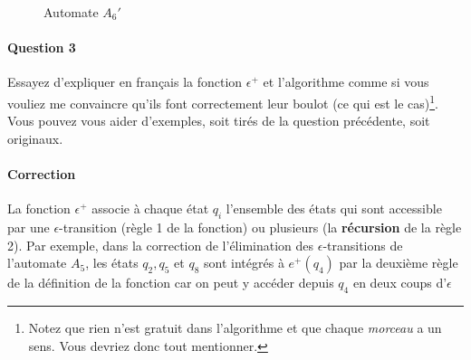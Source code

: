 \documentclass{article}[11pt]
\theoremstyle{definition}
\begin{document}
\begin{figure}[!h]
\centering

\caption{Automate $A_6'$}
\end{figure}



\paragraph*{Question 3} Essayez d'expliquer en français la fonction $\epsilon^+$ et l'algorithme comme si vous vouliez me convaincre qu'ils font correctement leur boulot (ce qui est le cas)\footnote{Notez que rien n'est gratuit dans l'algorithme et que chaque \textit{morceau} a un sens. Vous devriez donc tout mentionner.}. Vous pouvez vous aider d'exemples, soit tirés de la question précédente, soit originaux.


\paragraph*{Correction} La fonction $\epsilon^+$ associe à chaque état $q_i$ l'ensemble des états qui sont accessible par une $\epsilon$-transition (règle 1 de la fonction) ou plusieurs (la \textbf{récursion} de la règle 2). Par exemple, dans la correction de l'élimination des $\epsilon$-transitions de l'automate $A_5$, les états $q_2, q_5$ et $q_8$ sont intégrés à $e^+(q_4)$ par la deuxième règle de la définition de la fonction car on peut y accéder depuis $q_4$ en deux coups d'$\epsilon$
\end{document}
